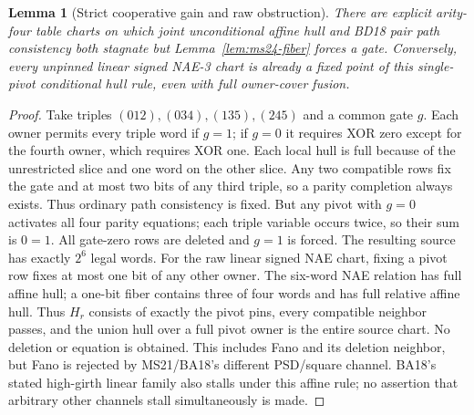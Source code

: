 \documentclass[11pt]{article}
\newtheorem{lemma}[theorem]{Lemma}
\begin{document}
\begin{lemma}[Strict cooperative gain and raw obstruction]\label{lem:ms24-stall}
There are explicit arity-four table charts on which joint unconditional affine hull and BD18 pair path consistency both stagnate but Lemma~\ref{lem:ms24-fiber} forces a gate. Conversely, every unpinned linear signed NAE-3 chart is already a fixed point of this single-pivot conditional hull rule, even with full owner-cover fusion.
\end{lemma}
\begin{proof}
Take triples $(012),(034),(135),(245)$ and a common gate $g$. Each owner permits every triple word if $g=1$; if $g=0$ it requires XOR zero except for the fourth owner, which requires XOR one. Each local hull is full because of the unrestricted slice and one word on the other slice. Any two compatible rows fix the gate and at most two bits of any third triple, so a parity completion always exists. Thus ordinary path consistency is fixed. But any pivot with $g=0$ activates all four parity equations; each triple variable occurs twice, so their sum is $0=1$. All gate-zero rows are deleted and $g=1$ is forced. The resulting source has exactly $2^6$ legal words.
For the raw linear signed NAE chart, fixing a pivot row fixes at most one bit of any other owner. The six-word NAE relation has full affine hull; a one-bit fiber contains three of four words and has full relative affine hull. Thus $H_r$ consists of exactly the pivot pins, every compatible neighbor passes, and the union hull over a full pivot owner is the entire source chart. No deletion or equation is obtained. This includes Fano and its deletion neighbor, but Fano is rejected by MS21/BA18's different PSD/square channel. BA18's stated high-girth linear family also stalls under this affine rule; no assertion that arbitrary other channels stall simultaneously is made.
\end{proof}
\end{document}
